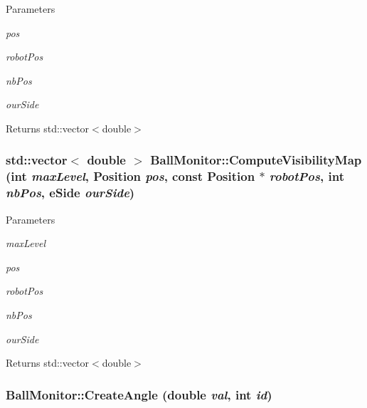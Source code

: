 \begin{DoxyParams}{Parameters}
\item[{\em pos}]\item[{\em robotPos}]\item[{\em nbPos}]\item[{\em ourSide}]\end{DoxyParams}
\begin{DoxyReturn}{Returns}
std::vector$<$double$>$ 
\end{DoxyReturn}
\hypertarget{classBallMonitor_a0d2ef73ba2b0573021c800c311e08245}{
\subsubsection[{ComputeVisibilityMap}]{\setlength{\rightskip}{0pt plus 5cm}std::vector$<$ double $>$ BallMonitor::ComputeVisibilityMap (int {\em maxLevel}, \/  Position {\em pos}, \/  const Position $\ast$ {\em robotPos}, \/  int {\em nbPos}, \/  eSide {\em ourSide})}}
\label{classBallMonitor_a0d2ef73ba2b0573021c800c311e08245}

\begin{DoxyParams}{Parameters}
\item[{\em maxLevel}]\item[{\em pos}]\item[{\em robotPos}]\item[{\em nbPos}]\item[{\em ourSide}]\end{DoxyParams}
\begin{DoxyReturn}{Returns}
std::vector$<$double$>$ 
\end{DoxyReturn}
\hypertarget{classBallMonitor_a805b7229e7db773c56e9987d794ada9a}{
\subsubsection[{CreateAngle}]{ BallMonitor::CreateAngle (double {\em val}, \/  int {\em id})}}
\label{classBallMonitor_a805b7229e7db773c56e9987d794ada9a}

